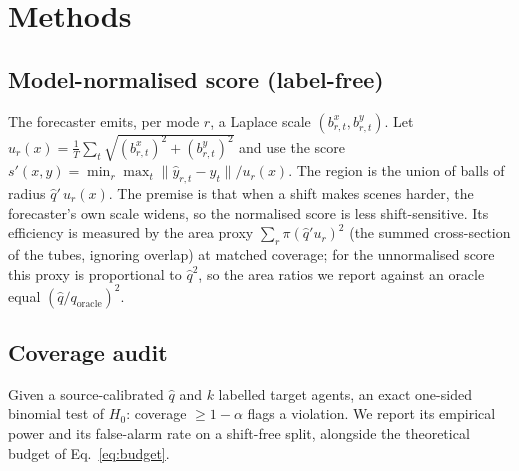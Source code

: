 \section{Methods}
\subsection{Model-normalised score (label-free)}\label{sec:norm}
The forecaster emits, per mode $r$, a Laplace scale $(b^x_{r,t},b^y_{r,t})$. Let
$u_r(x)=\tfrac1T\sum_t\sqrt{(b^x_{r,t})^2+(b^y_{r,t})^2}$ and use the score
$s'(x,y)=\min_r \max_t\|\hat y_{r,t}-y_t\|/u_r(x)$. The region is the union of balls of radius $\hat q'\,u_r(x)$. The premise is that when a
shift makes scenes harder, the forecaster's own scale widens, so the normalised score is less shift-sensitive. Its
efficiency is measured by the area proxy $\sum_r\pi(\hat q' u_r)^2$ (the summed cross-section of the tubes, ignoring
overlap) at matched coverage; for the unnormalised score this proxy is proportional to $\hat q^2$, so the area ratios we report
against an oracle equal $(\hat q/q_{\mathrm{oracle}})^2$.

\subsection{Coverage audit}\label{sec:audit}
Given a source-calibrated $\hat q$ and $k$ labelled target agents, an
exact one-sided binomial test of $H_0$: coverage $\ge1-\alpha$ flags
a violation. We report its empirical power and its false-alarm
rate on a shift-free split, alongside the theoretical budget of
Eq.~\eqref{eq:budget}.


